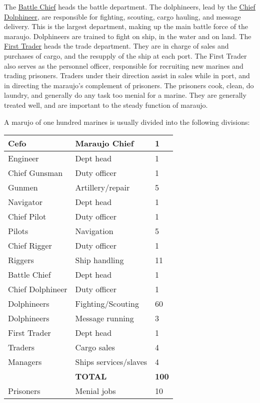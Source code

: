 \begin{multicols*}{2}
The \ul{Battle Chief} heads the battle department. The dolphineers, lead by the \ul{Chief Dolphineer}, are responsible for fighting, scouting, cargo hauling, and message delivery. This is the largest department, making up the main battle force of the maraujo. Dolphineers are trained to fight on ship, in the water and on land. The \ul{First Trader} heads the trade department. They are in charge of sales and purchases of cargo, and the resupply of the ship at each port. The First Trader also serves as the personnel officer, responsible for recruiting new marines and trading prisoners. Traders under their direction assist in sales while in port, and in directing the maraujo’s complement of prisoners. The prisoners cook, clean, do laundry, and generally do
any task too menial for a marine. They are generally treated well, and are important to the steady function of maraujo.

A marujo of one hundred marines is usually divided into the following divisions:

\begin{normbox}
\small
\begin{tabular}{@{} l l l}
Cefo & Maraujo Chief & 1 \\
\midrule
Engineer & Dept head & 1\\
Chief Gunsman & Duty officer & 1\\
Gunmen & Artillery/repair & 5\\
\midrule
Navigator & Dept head & 1\\
Chief Pilot & Duty officer & 1\\
Pilots & Navigation & 5\\
Chief Rigger & Duty officer & 1\\
Riggers & Ship handling & 11\\
\midrule
Battle Chief & Dept head & 1\\
Chief Dolphineer & Duty officer & 1\\
Dolphineers & Fighting/Scouting & 60\\
Dolphineers & Message running & 3\\
\midrule
First Trader & Dept head & 1\\
Traders & Cargo sales & 4\\
Managers & Ships services/slaves & 4\\
\midrule
 & \bf{TOTAL} & \bf{100}\\
 \midrule
Prisoners & Menial jobs & 10\\
\end{tabular}
\end{normbox}


\end{multicols*}
